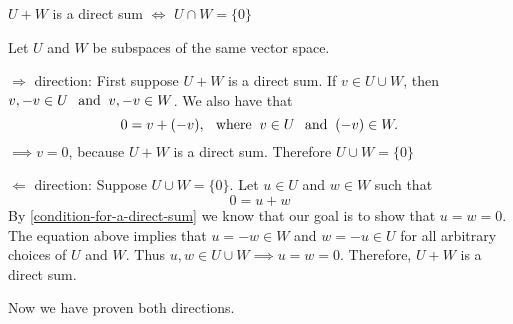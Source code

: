 \setcounter{thm}{45}
\begin{thm}
  \label{intersection-of-two-direct-sum-of-two-subscpaces}
  $U+W$ is a direct sum $\iff$ $U \cap W = \{0\}$
\end{thm}
\begin{prf} Let $U$ and $W$ be subspaces of the same vector space.
  \begin{description}
    \item{$\Rightarrow$ direction:} First suppose $U+W$ is a direct sum. If $v \in U \cup W$, then $v, -v \in U \;\;\, \text{and}\;\; v, -v \in W$. We also have that
    \begin{equation}
      0 = v + (-v), \;\;\, \text{where}\;\; v\in U \;\;\, \text{and}\;\; (-v) \in W.
    \end{equation}
    $\implies v=0$, because $U+W$  is a direct sum. Therefore $U \cup W = \{0\}$ 
    
    \item{$\Leftarrow$ direction:} Suppose $U\cup W = \{0\}$. Let  $u\in U$ and $w \in W$ such that
    \begin{equation}
      0 = u+w
    \end{equation}
    By \ref{condition-for-a-direct-sum} we know that our goal is to show that $u=w=0$. The equation above implies that $u=-w\in W$  and $w=-u \in U$ for all arbitrary choices of $U$ and $W$. Thus $u,w \in U\cup W \implies u=w=0.$ Therefore, $U+W$ is a direct sum.
  \end{description}
  Now we have proven both directions.
\end{prf}
